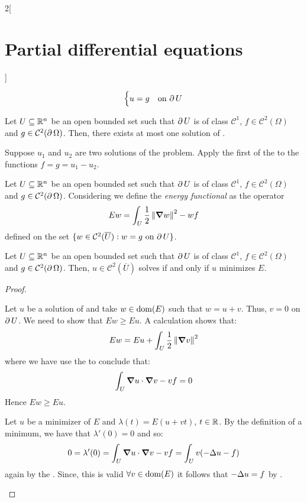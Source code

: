 \documentclass[../../../main_math.tex]{subfiles}
\begin{document}
\begin{multicols}{2}[\section{Partial differential equations}]
\begin{definition}
\begin{equation}
\begin{cases}
        u=g                & \text{on $\operatorname{\partial}{U}$}
      \end{cases}
    \end{equation}
  \end{definition}
  \begin{proposition}
    Let $U\subseteq \mathbb{R}^n$ be an open bounded set such that $\operatorname{\partial}{U}$ is of class $\mathcal{C}^1$, $f\in\mathcal{C}^2(\Omega)$ and $g\in\mathcal{C}^2(\operatorname{\partial}{\Omega})$. Then, there exists at most one solution of .
  \end{proposition}
  \begin{sproof}
    Suppose $u_1$ and $u_2$ are two solutions of the problem. Apply the first of the  to the functions $f = g = u_1-u_2$.
  \end{sproof}
  \begin{definition}
    Let $U\subseteq \mathbb{R}^n$ be an open bounded set such that $\operatorname{\partial}{U}$ is of class $\mathcal{C}^1$, $f\in\mathcal{C}^2(\Omega)$ and $g\in\mathcal{C}^2(\operatorname{\partial}{\Omega})$. Considering  we define the \emph{energy functional} as the operator $$Ew=\int_U\frac{1}{2}\left\|\grad w\right\|^2 - wf$$
    defined on the set $\{w\in\mathcal{C}^2(\overline{U}): w=g\text{ on $\operatorname{\partial}{U}$}\}$.
  \end{definition}
  \begin{theorem}
    Let $U\subseteq \mathbb{R}^n$ be an open bounded set such that $\operatorname{\partial}{U}$ is of class $\mathcal{C}^1$, $f\in\mathcal{C}^2(\Omega)$ and $g\in\mathcal{C}^2(\operatorname{\partial}{\Omega})$. Then, $u\in\mathcal{C}^2(\overline{U})$ solves  if and only if $u$ minimizes $E$.
  \end{theorem}
  \begin{proof}
    \begin{itemizeiff}
      Let $u$ be a solution of  and take $w\in \operatorname{dom}(E)$ such that $w=u+v$. Thus, $v=0$ on $\operatorname{\partial}{U}$. We need to show that $Ew\geq Eu$. A calculation shows that: $$Ew=Eu+\int_U\frac{1}{2}\left\|\grad v\right\|^2$$ where we have use the  to conclude that: $$\int_U\grad u\cdot\grad v-vf=0$$
      Hence $Ew\geq Eu$.
      \item Let $u$ be a minimizer of $E$ and $\lambda(t)=E(u+vt)$, $t\in \mathbb{R}$. By the definition of a minimum, we have that $\lambda'(0)=0$ and so:
      $$0 = \lambda'(0)=\int_U\grad u\cdot\grad v-vf=\int_Uv(-\Delta u-f)$$
      again by  the . Since, this is valid $\forall v\in\operatorname{dom}(E)$ it follows that $-\Delta u = f$ by .
    \end{itemizeiff}
  \end{proof}

\end{multicols}
\end{document}
